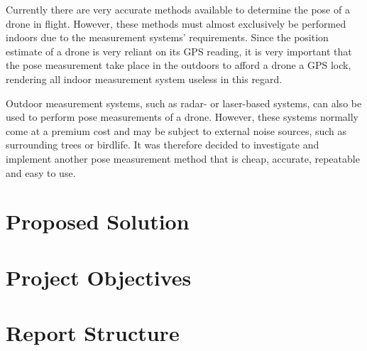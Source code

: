 Currently there are very accurate methods available to determine the pose of a drone in flight. However, these methods must almost exclusively be performed indoors due to the measurement systems' requirements. Since the position estimate of a drone is very reliant on its GPS reading, it is very important that the pose measurement take place in the outdoors to afford a drone a GPS lock, rendering all indoor measurement system useless in this regard. 

Outdoor measurement systems, such as radar- or laser-based systems, can also be used to perform pose measurements of a drone. However, these systems normally come at a premium cost and may be subject to external noise sources, such as surrounding trees or birdlife. It was therefore decided to investigate and implement another pose measurement method that is cheap, accurate, repeatable and easy to use. 

\section{Proposed Solution}



\section{Project Objectives}

\section{Report Structure}
